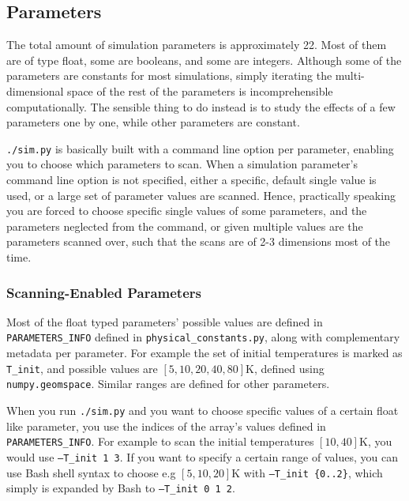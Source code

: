 \subsection{Parameters}

The total amount of simulation parameters is approximately 22. Most of them are of type float, some are booleans, and some are integers. Although some of the parameters are constants for most simulations, simply iterating the multi-dimensional space of the rest of the parameters is incomprehensible computationally. The sensible thing to do instead is to study the effects of a few parameters one by one, while other parameters are constant.

\texttt{./sim.py} is basically built with a command line option per parameter, enabling you to choose which parameters to scan. When a simulation parameter's command line option is not specified, either a specific, default single value is used, or a large set of parameter values are scanned. Hence, practically speaking you are forced to choose specific single values of some parameters, and the parameters neglected from the command, or given multiple values are the parameters scanned over, such that the scans are of 2-3 dimensions most of the time.

\subsubsection{Scanning-Enabled Parameters}\label{sssec:manual/multi-value-params}

Most of the float typed parameters' possible values are defined in \texttt{PARAMETERS\_INFO} defined in \texttt{physical\_constants.py}, along with complementary metadata per parameter. For example the set of initial temperatures is marked as \texttt{T\_init}, and possible values are $[5,10,20,40,80]\mathrm{K}$, defined using \texttt{numpy.geomspace}. Similar ranges are defined for other parameters.

When you run \texttt{./sim.py} and you want to choose specific values of a certain float like parameter, you use the indices of the array's values defined in \texttt{PARAMETERS\_INFO}. For example to scan the initial temperatures $[10,40]\mathrm{K}$, you would use \texttt{--T\_init 1 3}. If you want to specify a certain range of values, you can use Bash shell syntax to choose e.g $[5,10,20]\mathrm{K}$ with \texttt{--T\_init \{0..2\}}, which simply is expanded by Bash to \texttt{--T\_init 0 1 2}.

